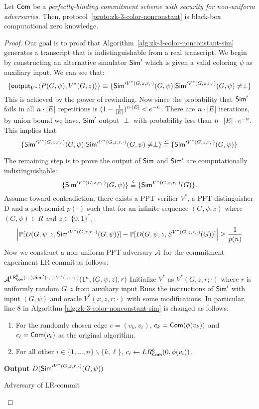 \begin{theorem}
Let ${\sf Com}$ be a {\it perfectly-binding commitment scheme with security for non-uniform adversaries.} Then, protocol~\ref{proto:zk-3-color-nonconstant} is black-box computational zero knowledge.
\end{theorem}
\begin{proof}
Our goal is to proof that Algorithm~\ref{alg:zk-3-color-nonconstant-sim} generates a transcript that is indistinguishable from a real transcript. We begin by constructing an alternative simulator ${\sf Sim}'$ which is given a valid coloring $\psi$ as auxiliary input. We can see that:
$$\{{\sf output}_{V^*}\langle P(G,\psi),V^*(G,z) \rangle \}\equiv\{{\sf Sim}'^{V^*(G,z,r,\cdot)}(G,\psi)|{\sf Sim}'^{V^*(G,z,r,\cdot)}(G,\psi)\neq\perp\}$$
This is achieved by the power of rewinding. Now since the probability that ${\sf Sim}'$ fails in all $n\cdot\left|E\right|$ repetitions is $(1-\frac{1}{\left|E\right|})^{n\cdot\left|E\right|}<e^{-n}$. There are $n\cdot\left|E\right|$ iterations, by union bound we have, ${\sf Sim}'$ output $\perp$ with probability less than $n\cdot\left|E\right|\cdot e^{-n}$. This implies that
$$\{{\sf Sim}'^{V^*(G,z,r,\cdot)}(G,\psi)|{\sf Sim}'^{V^*(G,z,r,\cdot)}(G,\psi)\neq\perp\}\stackrel{c}{\equiv}\{{\sf Sim}'^{V^*(G,z,r,\cdot)}(G,\psi)\}$$

The remaining step is to prove the output of ${\sf Sim}$ and ${\sf Sim}'$ are computationally indistinguishable:
$$\{{\sf Sim}'^{V^*(G,z,r,\cdot)}(G,\psi)\}\stackrel{c}{\equiv}\{{\sf Sim}^{V^*(G,z,r,\cdot)}(G)\}.$$
Assume toward contradiction, there exists a PPT verifier $V^*$, a PPT distinguisher D and a polynomial $p(\cdot)$ such that for an infinite sequence $(G,\psi,z)$ where $(G,\psi)\in R$ and $z\in\{0,1\}^*$,
$$\left|\mathop{\mathbb P\/}[D(G,\psi,z,{\sf Sim}'^{V^*(G,z,r,\cdot)}(G,\psi))]-\mathop{\mathbb P\/}[D(G,\psi,z,S^{V^*(G,z,r,\cdot)}(G))]\right|\geq\frac{1}{p(n)}$$
Now we construct a non-uniform PPT adversary $\mathcal{A}$ for the commitment experiment {\sf LR-commit} as follows:
\begin{algorithm}
$\mathcal{A}^{{\sf LR}^b_{{\sf Com}}(\cdot,\cdot),{\sf Sim}'(\cdot,\cdot),V^*(\cdot,\cdot,\cdot;\cdot)}(1^n,(G,\psi,z);r)$\;
Initialize $V^*$ as $V^*(G,z,r;\cdot)$ where $r$ is uniformly random $G,z$ from auxiliary input\;
Runs the instructions of ${\sf Sim}'$ with input $(G,\psi)$ and oracle $V^*(x,z,r;\cdot)$ with some modifications. In particular, line 8 in Algorithm \ref{alg:zk-3-color-nonconstant-sim} is changed as follows:
\begin{enumerate}
\item For the randomly chosen edge $e=(v_k,v_\ell)$, $c_k={\sf Com}(\phi(v_k))$ and $c_l={\sf Com}(v_\ell)$ as the original algorithm.
\item For all other $i\in\{1,\ldots,n\}\backslash\{k,\ell\}$, $c_i\gets LR^b_{\sf Com}(0,\phi(v_i))$.
\end{enumerate}
{\bf Output} $D({\sf Sim}'^{V^*(G,z,r;\cdot)}(G,\psi))$\;
\caption{Adversary of {\sf LR-commit}}\label{alg:zk-3-color-reduction}
\end{algorithm}


\end{proof}
